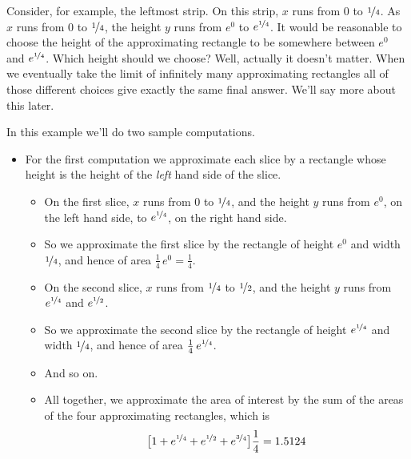 \begin{eg}
Consider, for example, the leftmost strip. On this strip, $x$ runs from $0$ to
$\nicefrac{1}{4}$. As $x$ runs from $0$ to $\nicefrac{1}{4}$, the height $y$
runs from $e^0$ to $e^{\nicefrac{1}{4}}$. It would be reasonable to choose the
height of the approximating rectangle to be somewhere between $e^0$ and
$e^{\nicefrac{1}{4}}$. Which
height should we choose? Well, actually it doesn't matter. When we eventually
take the limit of infinitely many approximating rectangles all of those
different choices give exactly the same final answer. We'll say more about this
later.

In this example we'll do two sample computations.
\begin{itemize}
\item For the first computation we approximate each slice by a rectangle
whose height is the height of the \emph{left} hand side of the slice.
\begin{itemize}
\item On the first slice, $x$ runs from $0$ to $\nicefrac{1}{4}$,
and the height $y$ runs from $e^0$, on the left hand side, to
$e^{\nicefrac{1}{4}}$, on the right hand side.

\item So we approximate the first slice by the rectangle of height
$e^0$ and width $\nicefrac{1}{4}$, and hence of area $\frac{1}{4}\,e^0
=\frac{1}{4}$.

\item On the second slice, $x$ runs from $\nicefrac{1}{4}$ to
$\nicefrac{1}{2}$, and the height $y$ runs from $e^{\nicefrac{1}{4}}$ and
$e^{\nicefrac{1}{2}}$.

\item So we approximate the second slice by the rectangle of height
$e^{\nicefrac{1}{4}}$ and width $\nicefrac{1}{4}$, and hence of area
$\frac{1}{4}\,e^{\nicefrac{1}{4}}$.

\item And so on.

\item All together, we approximate the area of interest by the sum
of the areas of the four approximating rectangles, which is
\begin{align*}
\big[1+ e^{\nicefrac{1}{4}} + e^{\nicefrac{1}{2}}
      +e^{\nicefrac{3}{4}}\big]\frac{1}{4}
=1.5124
\end{align*}


\end{itemize}
\end{itemize}
\end{eg}
